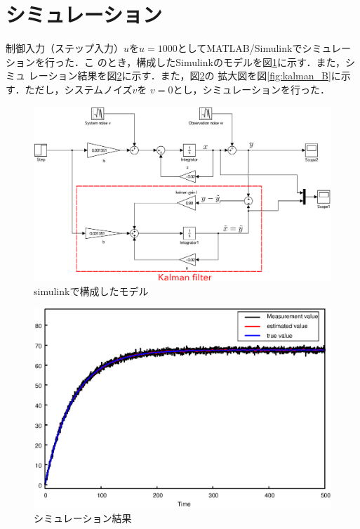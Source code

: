 \documentclass[a4paper,12pt]{jarticle}
\begin{document}
\section{シミュレーション}
制御入力（ステップ入力）$u$を$u=1000$としてMATLAB/Simulinkでシミュレーションを行った．こ
のとき，構成したSimulinkのモデルを図\ref{fig:kalman_b}に示す．また，シミュ
レーション結果を図\ref{fig:kalman_g}に示す．また，図\ref{fig:kalman_g}の
拡大図を図\ref{fig:kalman_B}に示す．ただし，システムノイズ$v$を
$v=0$とし，シミュレーションを行った．
%
\begin{figure}[tbp]
 \begin{center}
  \includegraphics[width = 150mm]{fig/kalmanfilter2.eps}
 \end{center}
 \caption{simulinkで構成したモデル}
 \label{fig:kalman_b}
\end{figure}
%
\begin{figure}[htbp]
 \begin{center}
  \includegraphics[width = 150mm]{fig/kalmanfilterG.eps}
 \end{center}
 \caption{シミュレーション結果}
 \label{fig:kalman_g}
\end{figure}
\end{document}
